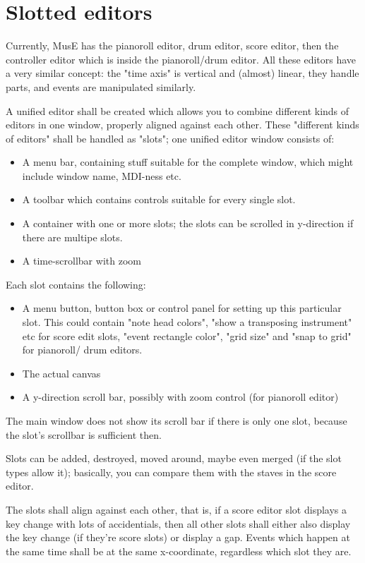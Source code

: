 \documentclass[a4paper]{report}
\begin{document}
\section{Slotted editors}
Currently, MusE has the pianoroll editor, drum editor, score editor,
then the controller editor which is inside the pianoroll/drum editor.
All these editors have a very similar concept: the "time axis" is
vertical and (almost) linear, they handle parts, and events are
manipulated similarly.

A unified editor shall be created which allows you to combine different
kinds of editors in one window, properly aligned against each other.
These "different kinds of editors" shall be handled as "slots"; one
unified editor window consists of:
\begin{itemize}
\item A menu bar, containing stuff suitable for the complete window,
      which might include window name, MDI-ness etc.
\item A toolbar which contains controls suitable for every single slot.
\item A container with one or more slots; the slots can be scrolled in
      y-direction if there are multipe slots.
\item A time-scrollbar with zoom
\end{itemize}

Each slot contains the following:
\begin{itemize}
\item A menu button, button box or control panel for setting up this
      particular slot. This could contain "note head colors", "show
      a transposing instrument" etc for score edit slots, "event
      rectangle color", "grid size" and "snap to grid" for pianoroll/
      drum editors.
\item The actual canvas
\item A y-direction scroll bar, possibly with zoom control (for
      pianoroll editor)
\end{itemize}

The main window does not show its scroll bar if there is only one slot,
because the slot's scrollbar is sufficient then.

Slots can be added, destroyed, moved around, maybe even merged (if the
slot types allow it); basically, you can compare them with the staves
in the score editor.

The slots shall align against each other, that is, if a score editor
slot displays a key change with lots of accidentials, then all other
slots shall either also display the key change (if they're score slots)
or display a gap. Events which happen at the same time shall be at the
same x-coordinate, regardless which slot they are.
\end{document}
